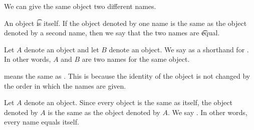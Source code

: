 

We can give the same object two different names.


An object \t{is} itself.
If the object denoted by one name is the same as the object denoted by a second name, then we say that the two names are \t{equal}.

Let $A$ denote an object and let $B$ denote an object.
We say  as a shorthand for .
In other words, $A$ and $B$ are two names for the same object.

 means the same as .
This is because the identity of the object is not changed by the order in which the names are given.

Let $A$ denote an object.
Since every object is the same as itself, the object denoted by $A$ is the same as the object denoted by $A$.
We say .
In other words, every name equals itself.

%
%
%
%

\blankpage
